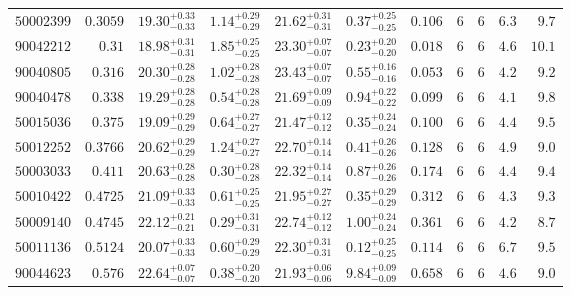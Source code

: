 \documentclass[11pt,twocolumn]{article}
\begin{document}
\begin{table}[!t]
\begin{tabular}{@{}rrrrrrrccrr@{}}
$50002399$ & $0.3059$ & $19.30^{+0.33}_{-0.33}$ & $1.14^{+0.29}_{-0.29}$ & $21.62^{+0.31}_{-0.31}$ & $0.37^{+0.25}_{-0.25}$ & $0.106$ & $6$ & $6$ & $6.3$ & $9.7$\\

$90042212$ & $0.31$ & $18.98^{+0.31}_{-0.31}$ & $1.85^{+0.25}_{-0.25}$ & $23.30^{+0.07}_{-0.07}$ & $0.23^{+0.20}_{-0.20}$ & $0.018$ & $6$ & $6$ & $4.6$ & $10.1$\\

 $90040805$ & $0.316$ & $20.30^{+0.28}_{-0.28}$ & $1.02^{+0.28}_{-0.28}$ & $23.43^{+0.07}_{-0.07}$ & $0.55^{+0.16}_{-0.16}$ & $0.053$ & $6$ & $6$ & $4.2$ & $9.2$\\

$90040478$ & $0.338$ & $19.29^{+0.28}_{-0.28}$ & $0.54^{+0.28}_{-0.28}$ & $21.69^{+0.09}_{-0.09}$ & $0.94^{+0.22}_{-0.22}$ & $0.099$ & $6$ & $6$ & $4.1$ & $9.8$\\

$50015036$ & $0.375$ & $19.09^{+0.29}_{-0.29}$ & $0.64^{+0.27}_{-0.27}$ & $21.47^{+0.12}_{-0.12}$ & $0.35^{+0.24}_{-0.24}$ & $0.100$ & $6$ & $6$ & $4.4$ & $9.5$\\

$50012252$ & $0.3766$ & $20.62^{+0.29}_{-0.29}$ & $1.24^{+0.27}_{-0.27}$ & $22.70^{+0.14}_{-0.14}$ & $0.41^{+0.26}_{-0.26}$ & $0.128$ & $6$ & $6$ & $4.9$ & $9.0$\\

$50003033$ & $0.411$ & $20.63^{+0.28}_{-0.28}$ & $0.30^{+0.28}_{-0.28}$ & $22.32^{+0.14}_{-0.14}$ & $0.87^{+0.26}_{-0.26}$ & $0.174$ & $6$ & $6$ & $4.4$ & $9.4$\\

 $50010422$ & $0.4725$ & $21.09^{+0.33}_{-0.33}$ & $0.61^{+0.25}_{-0.25}$ & $21.95^{+0.27}_{-0.27}$ & $0.35^{+0.29}_{-0.29}$ & $0.312$ & $6$ & $6$ & $4.3$ & $9.3$\\

$50009140$ & $0.4745$ & $22.12^{+0.21}_{-0.21}$ & $0.29^{+0.31}_{-0.31}$ & $22.74^{+0.12}_{-0.12}$ & $1.00^{+0.24}_{-0.24}$ & $0.361$ & $6$ & $6$ & $4.2$ & $8.7$\\

$50011136$ & $0.5124$ & $20.07^{+0.33}_{-0.33}$ & $0.60^{+0.29}_{-0.29}$ & $22.30^{+0.31}_{-0.31}$ & $0.12 ^{+0.25}_{-0.25}$ & $0.114$ & $6$ & $6$ & $6.7$ & $9.5$\\

\color{red} $90044623$ & \color{red} $0.576$ & \color{red} $22.64^{+0.07}_{-0.07}$ & \color{red} $0.38^{+0.20}_{-0.20}$ & \color{red} $21.93^{+0.06}_{-0.06}$ & \color{red} $9.84^{+0.09}_{-0.09}$  & \color{red} $0.658$ & \color{red} $6$ & \color{red} $6$ & \color{red} $4.6$ &\color{red}$9.0$\\


\end{tabular}
\end{table}
\end{document}
